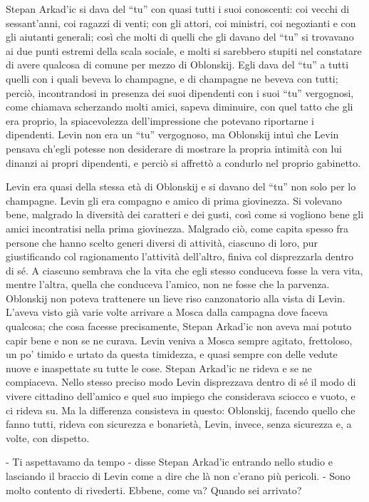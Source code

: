 Stepan Arkad'ic si dava del ``tu'' con quasi tutti i suoi conoscenti: coi vecchi di sessant'anni, coi ragazzi di venti; con gli attori, coi ministri, coi negozianti e con gli aiutanti generali; così che molti di quelli che gli davano del ``tu'' si trovavano ai due punti estremi della scala sociale, e molti si sarebbero stupiti nel constatare di avere qualcosa di comune per mezzo di Oblonskij. Egli dava del ``tu'' a tutti quelli con i quali beveva lo champagne, e di champagne ne beveva con tutti; perciò, incontrandosi in presenza dei suoi dipendenti con i suoi ``tu'' vergognosi, come chiamava scherzando molti amici, sapeva diminuire, con quel tatto che gli era proprio, la spiacevolezza dell'impressione che potevano riportarne i dipendenti. Levin non era un ``tu'' vergognoso, ma Oblonskij intuì che Levin pensava ch'egli potesse non desiderare di mostrare la propria intimità con lui dinanzi ai propri dipendenti, e perciò si affrettò a condurlo nel proprio gabinetto. 

Levin era quasi della stessa età di Oblonskij e si davano del ``tu'' non solo per lo champagne. Levin gli era compagno e amico di prima giovinezza. Si volevano bene, malgrado la diversità dei caratteri e dei gusti, così come si vogliono bene gli amici incontratisi nella prima giovinezza. Malgrado ciò, come capita spesso fra persone che hanno scelto generi diversi di attività, ciascuno di loro, pur giustificando col ragionamento l'attività dell'altro, finiva col disprezzarla dentro di sé. A ciascuno sembrava che la vita che egli stesso conduceva fosse la vera vita, mentre l'altra, quella che conduceva l'amico, non ne fosse che la parvenza. Oblonskij non poteva trattenere un lieve riso canzonatorio alla vista di Levin. L'aveva visto già varie volte arrivare a Mosca dalla campagna dove faceva qualcosa; che cosa facesse precisamente, Stepan Arkad'ic non aveva mai potuto capir bene e non se ne curava. Levin veniva a Mosca sempre agitato, frettoloso, un po' timido e urtato da questa timidezza, e quasi sempre con delle vedute nuove e inaspettate su tutte le cose. Stepan Arkad'ic ne rideva e se ne compiaceva. Nello stesso preciso modo Levin disprezzava dentro di sé il modo di vivere cittadino dell'amico e quel suo impiego che considerava sciocco e vuoto, e ci rideva su. Ma la differenza consisteva in questo: Oblonskij, facendo quello che fanno tutti, rideva con sicurezza e bonarietà, Levin, invece, senza sicurezza e, a volte, con dispetto. 

- Ti aspettavamo da tempo - disse Stepan Arkad'ic entrando nello studio e lasciando il braccio di Levin come a dire che là non c'erano più pericoli. - Sono molto contento di rivederti. Ebbene, come va? Quando sei arrivato? 

